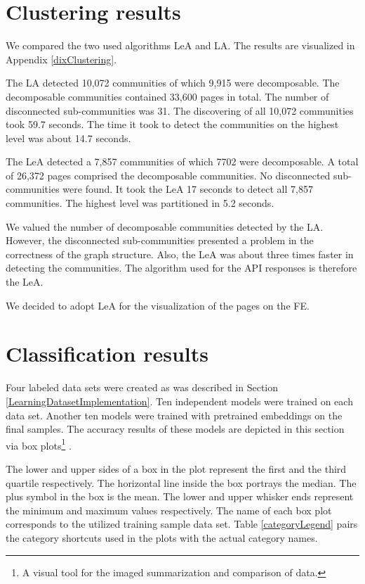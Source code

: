 \label{evaluation}
\section{Clustering results}\label{clusteringEvaluation}
We compared the two used algorithms LeA and LA. The results are visualized in Appendix \ref{dixClustering}.

The LA detected 10,072 communities of which 9,915 were decomposable. The decomposable communities contained 33,600 pages in total. The number of disconnected sub-communities was 31. The discovering of all 10,072 communities took 59.7 seconds. The time it took to detect the communities on the highest level was about 14.7 seconds. 

The LeA detected a 7,857 communities of which 7702 were decomposable. A total of 26,372 pages comprised the decomposable communities. No disconnected sub-communities were found. It took the LeA 17 seconds to detect all 7,857 communities. The highest level was partitioned in 5.2 seconds. 

We valued the number of decomposable communities detected by the LA. However, the disconnected sub-communities presented a problem in the correctness of the graph structure. Also, the LeA was about three times faster in detecting the communities. The algorithm used for the API responses is therefore the LeA. 

We decided to adopt LeA for the visualization of the pages on the FE. 

\section{Classification results}\label{classificationEvaluation}
Four labeled data sets were created as was described in Section \ref{LearningDatasetImplementation}. Ten independent models were trained on each data set. Another ten models were trained with pretrained embeddings on the final samples. The accuracy results of these models are depicted in this section via box plots\footnote{A visual tool for the imaged summarization and comparison of data.} \cite{boxplot}. 

The lower and upper sides of a box in the plot represent the first and the third quartile respectively. The horizontal line inside the box portrays the median. The plus symbol in the box is the mean. The lower and upper whisker ends represent the minimum and maximum values respectively. The name of each box plot corresponds to the utilized training sample data set. Table \ref{categoryLegend} pairs the category shortcuts used in the plots with the actual category names. 

